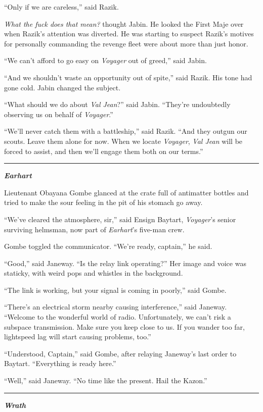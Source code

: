 \documentclass[twoside,letterpaper,12pt]{memoir}
\begin{document}
``Only if we are careless,'' said Razik.

\textit{What the fuck does that mean?} thought Jabin. He looked the First Maje over when Razik's attention was diverted. He was starting to suspect Razik's motives for personally commanding the revenge fleet were about more than just honor.

``We can't afford to go easy on \textit{Voyager} out of greed,'' said Jabin.

``And we shouldn't waste an opportunity out of spite,'' said Razik. His tone had gone cold. Jabin changed the subject.

``What should we do about \textit{Val Jean}?'' said Jabin. ``They're undoubtedly observing us on behalf of \textit{Voyager}.''

``We'll never catch them with a battleship,'' said Razik. ``And they outgun our scouts. Leave them alone for now. When we locate \textit{Voyager}, \textit{Val Jean} will be forced to assist, and then we'll engage them both on our terms.''

\fancybreak{\rule{3cm}{0.4 pt}}
\textit{\textbf{Earhart}}

Lieutenant Obayana Gombe glanced at the crate full of antimatter bottles and tried to make the sour feeling in the pit of his stomach go away.

``We've cleared the atmosphere, sir,'' said Ensign Baytart, \textit{Voyager}'s senior surviving helmsman, now part of \textit{Earhart}'s five-man crew.

Gombe toggled the communicator. ``We're ready, captain,'' he said.

``Good,'' said Janeway. ``Is the relay link operating?'' Her image and voice was staticky, with weird pops and whistles in the background.

``The link is working, but your signal is coming in poorly,'' said Gombe.

``There's an electrical storm nearby causing interference,'' said Janeway. ``Welcome to the wonderful world of radio. Unfortunately, we can't risk a subspace transmission. Make sure you keep close to us. If you wander too far, lightspeed lag will start causing problems, too.''

``Understood, Captain,'' said Gombe, after relaying Janeway's last order to Baytart. ``Everything is ready here.''

``Well,'' said Janeway. ``No time like the present. Hail the Kazon.''

\fancybreak{\rule{3cm}{0.4 pt}}
\noindent\textit{\textbf{Wrath}}\\
\end{document}
